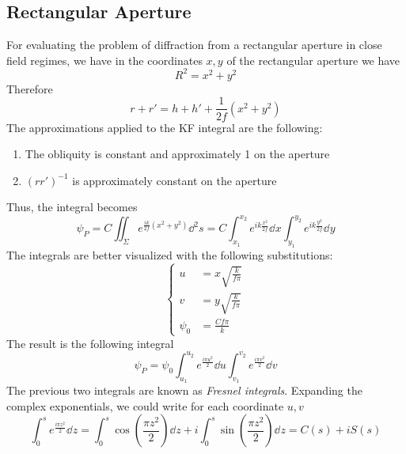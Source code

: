 \documentclass[../electromagnetism.tex]{subfiles}
\begin{document}
\subsection{Rectangular Aperture}
For evaluating the problem of diffraction from a rectangular aperture in close field regimes, we have in the coordinates $x, y$ of the rectangular aperture we have
\begin{equation*}
	R^2=x^2+y^2
\end{equation*}
Therefore
\begin{equation*}
	r+r'=h+h'+\frac{1}{2f}\left( x^2+y^2 \right)
\end{equation*}
The approximations applied to the KF integral are the following:
\begin{enumerate}
\item The obliquity is constant and approximately 1 on the aperture
\item $(rr')^{-1}$ is approximately constant on the aperture
\end{enumerate}
Thus, the integral becomes
\begin{equation}
	\psi_P=C\iint_\Sigma e^{\frac{ik}{2f}\left( x^2+y^2 \right)}\dd^2s=C\int_{x_1}^{x_2}e^{ik\frac{x^2}{2f}}\dd^{}{x}\int_{y_1}^{y_2}e^{ik\frac{y^2}{2f}}\dd^{}{y}
	\label{eq:fresnelkfsquare.diff}
\end{equation}
The integrals are better visualized with the following substitutions:
\begin{equation*}
	\left\{\begin{aligned}
		u&= x\sqrt{\frac{k}{f\pi}}\\
		v&= y\sqrt{\frac{k}{f\pi}}\\
		\psi_0&= \frac{Cf\pi}{k}
	\end{aligned}\right.
\end{equation*}
The result is the following integral
\begin{equation}
	\psi_P=\psi_0\int_{u_1}^{u_2}e^{\frac{i\pi u^2}{2}}\dd{u}\int_{v_1}^{v_2}e^{\frac{i\pi v^2}{2}}\dd^{}{v}
	\label{eq:integralsquarefr.diff}
\end{equation}
The previous two integrals are known as \textit{Fresnel integrals}. Expanding the complex exponentials, we could write for each coordinate $u, v$
\begin{equation}
	\int_{0}^{s}e^{\frac{i\pi z^2}{2}}\dd^{}{z}=\int_{0}^{s}\cos\left( \frac{\pi z^2}{2} \right)\dd^{}{z}+i\int_{0}^{s}\sin\left( \frac{\pi z^2}{2} \right)\dd^{}{z}=C(s)+iS(s)
	\label{eq:fresnelintegrals.diff}
\end{equation}
\end{document}
